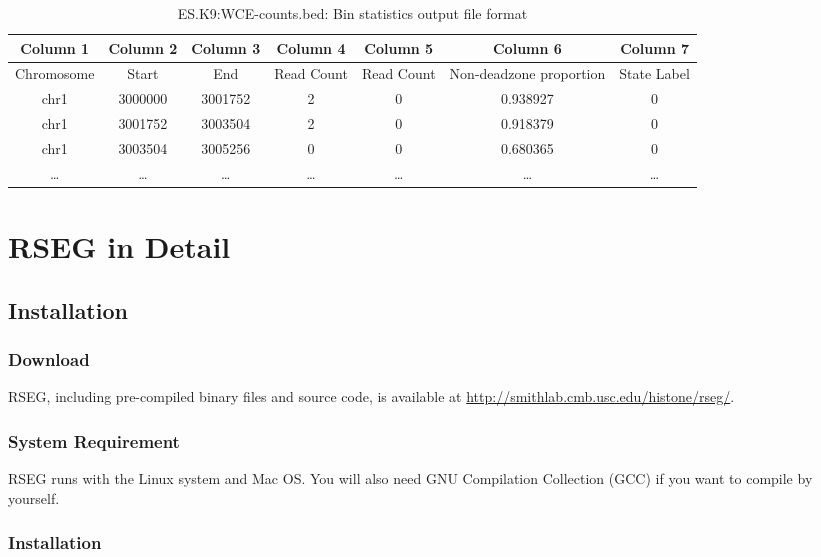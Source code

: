 \documentclass[11pt]{report}
\begin{document}
\begin{table}[th]
  \centering
  \begin{tabular}{c c c c c c c }
    Column 1 & Column 2 & Column 3 &  Column 4 & Column 5 &  Column 6
    & Column 7\\
    \hline
    Chromosome  & Start & End & Read Count & Read Count & Non-deadzone proportion &
    State Label \\
    \hline
chr1&    3000000& 3001752& 2&       0&       0.938927&        0\\
chr1&    3001752& 3003504& 2&       0&       0.918379&        0\\
chr1&    3003504& 3005256& 0&       0&       0.680365&        0\\
    \ldots & \ldots &\ldots &\ldots &\ldots &\ldots & \ldots \\ 
    \hline
  \end{tabular}
  \caption{ES.K9:WCE-counts.bed: Bin statistics output file format}
  \label{tab:format-bin-diff}
\end{table}


\chapter{RSEG in Detail}
\label{chap:rseg-manual}

\section{Installation}
\label{sec:install}

\subsection*{Download}

RSEG, including pre-compiled binary files and source code, is
available at \url{http://smithlab.cmb.usc.edu/histone/rseg/}.

\subsection*{System Requirement}

RSEG runs with the Linux system and Mac OS. You will also need GNU
Compilation Collection (GCC) if you want to compile by yourself.

\subsection*{Installation}
\end{document}
